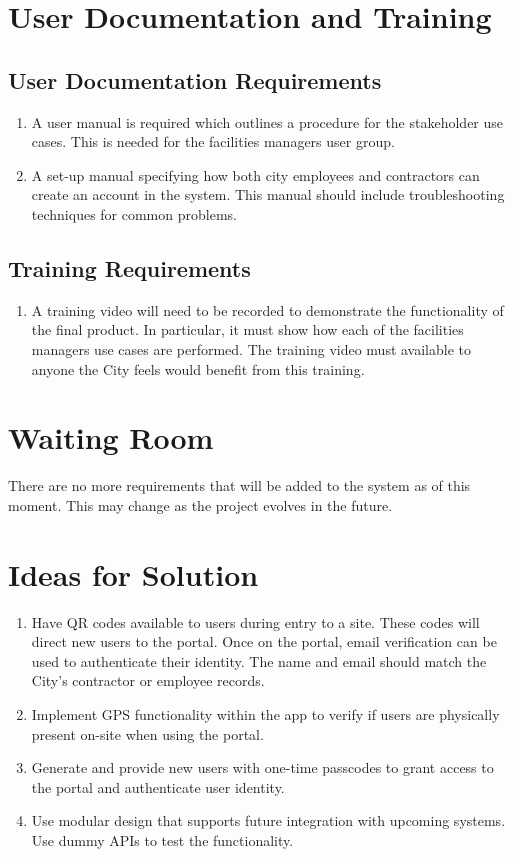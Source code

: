 \documentclass[12pt]{article}
\begin{document}
\section{User Documentation and Training}
\subsection{User Documentation Requirements}
\begin{enumerate} [{UDT-DR}1.]
  \item A user manual is required which outlines a procedure for the stakeholder
    use cases. This is needed for the facilities managers user group.
  \item A set-up manual specifying how both city employees and contractors
    can create an account in the system. This manual should include
    troubleshooting techniques for common problems.
\end{enumerate}

\subsection{Training Requirements}
\begin{enumerate} [{UDT-TR}1.]
  \item A training video will need to be recorded to demonstrate the
    functionality of the final product. In particular, it must show how each of
    the facilities managers use cases are performed. The training
    video must available to
    anyone the City feels would benefit from this training.
\end{enumerate}

\section{Waiting Room}
There are no more requirements that will be added to the system as of this
moment. This may change as the project evolves in the future.

\section{Ideas for Solution}
\begin{enumerate}
  \item Have QR codes available to users during entry to a site.
    These codes will direct new users to the portal. Once on the
    portal, email verification can be used to authenticate their
    identity. The name and email should match the City's contractor
    or employee records.
  \item Implement GPS functionality within the app to verify if users
    are physically present on-site when using the portal.
  \item Generate and provide new users with one-time passcodes to
    grant access to the portal and authenticate user identity.
  \item Use modular design that supports future integration with
    upcoming systems. Use dummy APIs to test the functionality.
\end{enumerate}
\end{document}
